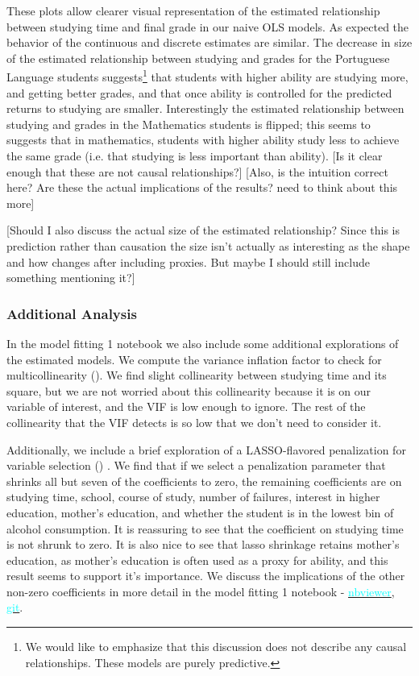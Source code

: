 \documentclass[12pt]{article}
\begin{document}
These plots allow clearer visual representation of the estimated relationship between studying time and final grade in our naive OLS models. As expected the behavior of the continuous and discrete estimates are similar. The decrease in size of the estimated relationship between studying and grades for the Portuguese Language students suggests\footnote{We would like to emphasize that this discussion does not describe any causal relationships. These models are purely predictive.} that students with higher ability are studying more, and getting better grades, and that once ability is controlled for the predicted returns to studying are smaller. Interestingly the estimated relationship between studying and grades in the Mathematics students is flipped; this seems to suggests that in mathematics, students with higher ability study less to achieve the same grade (i.e. that studying is less important than ability). \textcolor{BrickRed}{[Is it clear enough that these are not causal relationships?] [Also, is the intuition correct here? Are these the actual implications of the results? need to think about this more]}

\textcolor{BrickRed}{[Should I also discuss the actual size of the estimated relationship? Since this is prediction rather than causation the size isn't actually as interesting as the shape and how changes after including proxies. But maybe I should still include something mentioning it?]}

\subsubsection{Additional Analysis}
In the model fitting 1 notebook we also include some additional explorations of the estimated models. We compute the variance inflation factor to check for multicollinearity (\cite{VIF, detecting}). We find slight collinearity between studying time and its square, but we are not worried about this collinearity because it is on our variable of interest, and the VIF is low enough to ignore. The rest of the collinearity that the VIF detects is so low that we don't need to consider it.

Additionally, we include a brief exploration of a LASSO-flavored penalization for variable selection (\cite{MLmetrics}) . We find that if we select a penalization parameter that shrinks all but seven of the coefficients to zero, the remaining coefficients are on studying time, school, course of study, number of failures, interest in higher education, mother's education, and whether the student is in the lowest bin of alcohol consumption. It is reassuring to see that the coefficient on studying time is not shrunk to zero. It is also nice to see that lasso shrinkage retains mother's education, as mother's education is often used as a proxy for ability, and this result seems to support it's importance. We discuss the implications of the other non-zero coefficients in more detail in the model fitting 1 notebook - \href{https://nbviewer.jupyter.org/github/nadavtadelis/Reproducible_Metrics/blob/master/model_fitting_1.ipynb}{\textcolor{cyan}{nbviewer}}, \href{https://github.com/nadavtadelis/Reproducible_Metrics/blob/master/model_fitting_1.ipynb}{\textcolor{cyan}{git}}.
\end{document}

